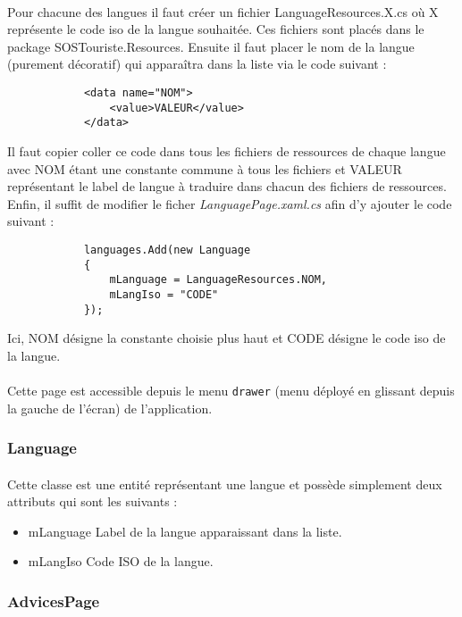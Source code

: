 	\paragraph{}
		Pour chacune des langues il faut créer un fichier LanguageResources.X.cs où X représente le code iso de la langue souhaitée. Ces fichiers sont placés dans le package SOSTouriste.Resources. Ensuite il faut placer le nom de la langue (purement décoratif) qui apparaîtra dans la liste via le code suivant :
		\lstset{style=sharpc}
		\begin{lstlisting}
			<data name="NOM">
				<value>VALEUR</value>
			</data>
		\end{lstlisting}
		Il faut copier coller ce code dans tous les fichiers de ressources de chaque langue avec NOM étant une constante commune à tous les fichiers et VALEUR représentant le label de langue à traduire dans chacun des fichiers de ressources. Enfin, il suffit de modifier le ficher \emph{LanguagePage.xaml.cs} afin d'y ajouter le code suivant : 
		\lstset{style=sharpc}
		\begin{lstlisting}
			languages.Add(new Language
			{
				mLanguage = LanguageResources.NOM,
				mLangIso = "CODE"
			});
		\end{lstlisting}
		
		Ici, NOM désigne la constante choisie plus haut et CODE désigne le code iso de la langue.
	
	\paragraph{}
	Cette page est accessible depuis le menu \texttt{drawer} (menu déployé en glissant depuis la gauche de l'écran) de l'application.

	\subsubsection{Language}
		\paragraph{}
			Cette classe est une entité représentant une langue et possède simplement deux attributs qui sont les suivants :
			\begin{itemize}
				\item mLanguage Label de la langue apparaissant dans la liste.
				\item mLangIso Code ISO de la langue.
			\end{itemize}
	\subsubsection{AdvicesPage}
